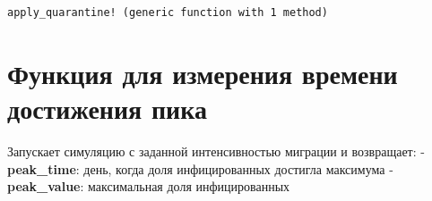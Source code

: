 \documentclass[
  12pt,
  a4paper,
  DIV=11,
  numbers=noendperiod]{scrreprt}
\begin{document}
\begin{verbatim}
apply_quarantine! (generic function with 1 method)
\end{verbatim}

\section{Функция для измерения времени достижения
пика}\label{ux444ux443ux43dux43aux446ux438ux44f-ux434ux43bux44f-ux438ux437ux43cux435ux440ux435ux43dux438ux44f-ux432ux440ux435ux43cux435ux43dux438-ux434ux43eux441ux442ux438ux436ux435ux43dux438ux44f-ux43fux438ux43aux430-1}

Запускает симуляцию с заданной интенсивностью миграции и возвращает: -
\textbf{peak\_time}: день, когда доля инфицированных достигла максимума
- \textbf{peak\_value}: максимальная доля инфицированных
\end{document}
